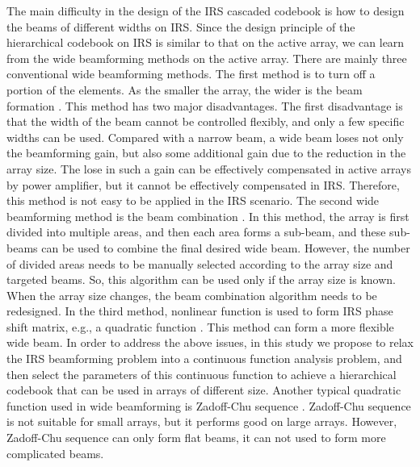 \documentclass[12pt,draftclsnofoot,onecolumn]{IEEEtran}
\begin{document}
The main difficulty in the design of the IRS cascaded  codebook is how to design the beams of different widths on IRS. Since the design principle of the hierarchical codebook on IRS is similar to that on the active array, we can learn from the wide beamforming methods on the active array. There are mainly three conventional wide beamforming methods. The first method is to turn off a portion of the elements. As the smaller the array, the wider is the beam formation \cite{DBLP:journals/twc/XiaoHXX16}. This method has two major disadvantages. The first disadvantage is that the width of the beam cannot be controlled flexibly, and only a few specific widths can be used. Compared with a narrow beam, a wide beam  loses not only the beamforming gain, but also some additional gain due to the reduction in the array size. The lose in such a gain can be effectively compensated  in active arrays by power amplifier, but it cannot be effectively compensated in IRS. Therefore, this method is not easy to be applied  in the IRS scenario. The second wide beamforming method is the  beam combination \cite{DBLP:conf/icc/Zhang022a}. In this method,  the array is first divided into multiple areas, and then each area forms a sub-beam, and these sub-beams can be used to combine the final desired wide beam. However, the number of divided areas needs to be manually selected according to the array size and targeted beams. So, this algorithm can  be used only if  the array size is known. When the array size changes, the beam combination algorithm needs to be redesigned. In the third method, nonlinear function is used to form IRS phase shift matrix, e.g., a quadratic function \cite{DBLP:journals/icl/JamaliNSP21}. This method can form a more flexible wide beam. In order to address the above issues, in this study  we propose to relax the IRS beamforming problem into a continuous function analysis problem, and then select the parameters of this continuous function to achieve a hierarchical codebook that can be used in arrays of different size. Another typical quadratic function used in wide beamforming is Zadoff-Chu sequence \cite{DBLP:journals/tit/Chu72,DBLP:journals/icl/PengT18}. Zadoff-Chu sequence is not suitable for small arrays, but it performs good on large arrays. However, Zadoff-Chu sequence can only form flat beams, it can not used to form more complicated beams.
\end{document}

